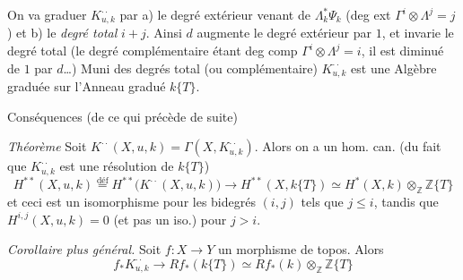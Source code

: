 \documentclass[11pt,a4paper]{article}
\begin{document}
On va graduer $K^{\cdot\cdot}_{u,k}$ par a) le degré extérieur venant de
$\Lambda^*_k \Psi_k$ (deg ext $\Gamma^i \otimes \Lambda^j = j$) et b) le \emph{degré
total} $i + j$. Ainsi $d$ augmente le degré extérieur par $1$, et invarie le degré total
\struck{\ill{}} (le degré complémentaire étant deg comp $\Gamma^i \otimes \Lambda^j = i$,
il est diminué de $1$ par $d$\ldots) Muni des degrés total (ou complémentaire)
$K^{\cdot\cdot}_{u,k}$ est une Algèbre graduée sur l'Anneau gradué $k\{T\}$.

Conséquences (de ce qui précède de suite)

\emph{Théorème} Soit $K^{\cdot\cdot}(X, u, k) = \Gamma(X, K^{\cdot\cdot}_{u,k})$.
Alors on a un hom. can. (du fait que $K^{\cdot\cdot}_{u,k}$ \struck{\ill{}} est une
résolution de $k\{T\}$)
\[
  H^{**}(X, u, k) \overset{\text{déf}}{=} H^{**}\bigl(K^{\cdot\cdot}(X, u, k)\bigr)
  \longrightarrow H^{**}(X, k\{T\}) \simeq H^*(X, k) \otimes_{\mathbb{Z}} \mathbb{Z}\{T\}
\]
et ceci est un isomorphisme pour les bidegrés $(i, j)$ tels que \struck{\ill{}}
$j \leq i$, tandis que $H^{i,j}(X, u, k) = 0$ (et pas un iso.) pour $j > i$.


\emph{Corollaire plus général.} Soit $f : X \to Y$ un morphisme de topos. Alors
\[
  f_* K^{\cdot\cdot}_{u,k} \longrightarrow Rf_*(k\{T\}) \simeq Rf_*(k) \otimes_{\mathbb{Z}} \mathbb{Z}\{T\}
\]
\end{document}
